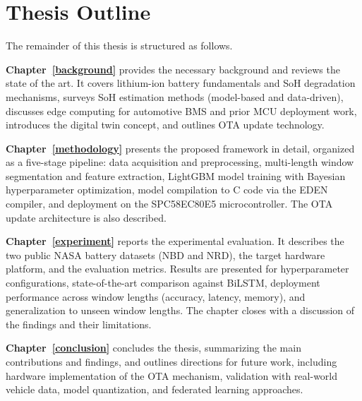 \section{Thesis Outline}

The remainder of this thesis is structured as follows.

\textbf{Chapter~\ref{background}} provides the necessary background and reviews the state of the art. It covers lithium-ion battery fundamentals and SoH degradation mechanisms, surveys SoH estimation methods (model-based and data-driven), discusses edge computing for automotive BMS and prior MCU deployment work, introduces the digital twin concept, and outlines OTA update technology.

\textbf{Chapter~\ref{methodology}} presents the proposed framework in detail, organized as a five-stage pipeline: data acquisition and preprocessing, multi-length window segmentation and feature extraction, LightGBM model training with Bayesian hyperparameter optimization, model compilation to C code via the EDEN compiler, and deployment on the SPC58EC80E5 microcontroller. The OTA update architecture is also described.

\textbf{Chapter~\ref{experiment}} reports the experimental evaluation. It describes the two public NASA battery datasets (NBD and NRD), the target hardware platform, and the evaluation metrics. Results are presented for hyperparameter configurations, state-of-the-art comparison against BiLSTM, deployment performance across window lengths (accuracy, latency, memory), and generalization to unseen window lengths. The chapter closes with a discussion of the findings and their limitations.

\textbf{Chapter~\ref{conclusion}} concludes the thesis, summarizing the main contributions and findings, and outlines directions for future work, including hardware implementation of the OTA mechanism, validation with real-world vehicle data, model quantization, and federated learning approaches.
